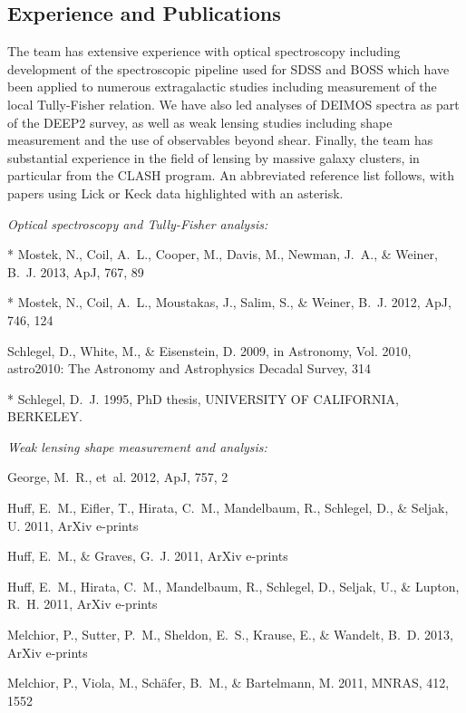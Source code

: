 \documentclass[12pt]{article}
\begin{document}
\subsection{Experience and Publications}
The team has extensive experience with optical spectroscopy including development of the spectroscopic pipeline used for SDSS and BOSS which have been applied to numerous extragalactic studies including measurement of the local Tully-Fisher relation. We have also led analyses of DEIMOS spectra as part of the DEEP2 survey, as well as weak lensing studies including shape measurement and the use of observables beyond shear. {\color{red} Finally, the team has substantial experience in the field of lensing by massive galaxy clusters, in particular from the CLASH program.} An abbreviated reference list follows, with papers using Lick or Keck data highlighted with an asterisk.

{\small
\begin{description}
\item \textit{Optical spectroscopy and Tully-Fisher analysis:}
  \begin{description}
  \item {}, N., {Coil}, A.~L., {Cooper}, M., {Davis}, M., {Newman}, J.~A., \&
    {Weiner}, B.~J. 2013, ApJ, 767, 89
  \item {}, N., {Coil}, A.~L., {Moustakas}, J., {Salim}, S., \& {Weiner}, B.~J.
    2012, ApJ, 746, 124
  \item {Schlegel}, D., {White}, M., \& {Eisenstein}, D. 2009, in Astronomy, Vol. 2010,
    astro2010: The Astronomy and Astrophysics Decadal Survey, 314
  \item {}, D.~J. 1995, PhD thesis, UNIVERSITY OF CALIFORNIA, BERKELEY.
  \end{description}
\item \textit{Weak lensing shape measurement and analysis:}
  \begin{description}
  \item {George}, M.~R., {et~al.} 2012, ApJ, 757, 2
  \item {Huff}, E.~M., {Eifler}, T., {Hirata}, C.~M., {Mandelbaum}, R., {Schlegel}, D.,
    \& {Seljak}, U. 2011{}, ArXiv e-prints
  \item {Huff}, E.~M., \& {Graves}, G.~J. 2011, ArXiv e-prints
  \item {Huff}, E.~M., {Hirata}, C.~M., {Mandelbaum}, R., {Schlegel}, D., {Seljak}, U.,
    \& {Lupton}, R.~H. 2011{}, ArXiv e-prints
  \item {Melchior}, P., {Sutter}, P.~M., {Sheldon}, E.~S., {Krause}, E., \& {Wandelt},
    B.~D. 2013, ArXiv e-prints
  \item {Melchior}, P., {Viola}, M., {Sch{\"a}fer}, B.~M., \& {Bartelmann}, M. 2011,
    MNRAS, 412, 1552
  \end{description}
\end{description}
}
\end{document}
